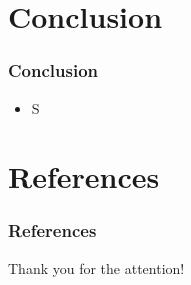 


\section{Conclusion}

\begin{frame}
  \frametitle{Conclusion}

  \pause
  \begin{itemize}
    \item<+-> S
  \end{itemize}
\end{frame}

\section*{References}
\begin{frame}%
  \frametitle{References}
  \nocite{*}
  
  
\end{frame}

\begin{frame}
  \centering
  {\Huge Thank you for the attention!}
\end{frame}



